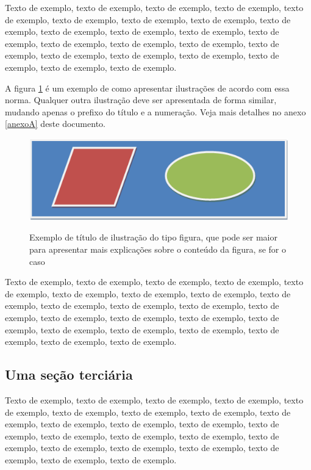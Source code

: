 \documentclass[
	12pt,				%
	oneside,			%
	a4paper,			%
	english,			%
	brazil				%
	]{abntex2ppgsi}
\begin{document}
Texto de exemplo, texto de exemplo, texto de exemplo, texto de exemplo, texto de exemplo, texto de exemplo, texto de exemplo, texto de exemplo, texto de exemplo, texto de exemplo, texto de exemplo, texto de exemplo, texto de exemplo, texto de exemplo, texto de exemplo, texto de exemplo, texto de exemplo, texto de exemplo, texto de exemplo, texto de exemplo, texto de exemplo, texto de exemplo, texto de exemplo.

A figura \ref{fig:figura-exemplo2} é um exemplo de como apresentar ilustrações de acordo com essa norma. Qualquer outra ilustração deve ser apresentada de forma similar, mudando apenas o prefixo do título e a numeração. Veja mais detalhes no anexo \ref{anexoA} deste documento.

\begin{figure}[htbp]
	\centering
  \caption{Exemplo de título de ilustração do tipo figura, que pode ser maior para apresentar mais explicações sobre o conteúdo da figura, se for o caso}
		\includegraphics{figuras/figura-exemplo.png}
	\label{fig:figura-exemplo2}
\end{figure}

Texto de exemplo, texto de exemplo, texto de exemplo, texto de exemplo, texto de exemplo, texto de exemplo, texto de exemplo, texto de exemplo, texto de exemplo, texto de exemplo, texto de exemplo, texto de exemplo, texto de exemplo, texto de exemplo, texto de exemplo, texto de exemplo, texto de exemplo, texto de exemplo, texto de exemplo, texto de exemplo, texto de exemplo, texto de exemplo, texto de exemplo.

\subsection{Uma seção terciária}

Texto de exemplo, texto de exemplo, texto de exemplo, texto de exemplo, texto de exemplo, texto de exemplo, texto de exemplo, texto de exemplo, texto de exemplo, texto de exemplo, texto de exemplo, texto de exemplo, texto de exemplo, texto de exemplo, texto de exemplo, texto de exemplo, texto de exemplo, texto de exemplo, texto de exemplo, texto de exemplo, texto de exemplo, texto de exemplo, texto de exemplo.
\end{document}
